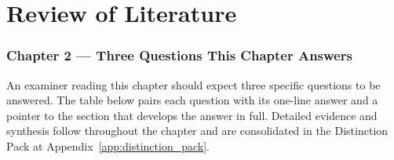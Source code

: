
\chapter{Review of Literature}

\subsection*{Chapter 2 --- Three Questions This Chapter Answers}
\label{sec:ch2_three_questions}

\noindent An examiner reading this chapter should expect three specific questions to be answered. The table below pairs each question with its one-line answer and a pointer to the section that develops the answer in full. Detailed evidence and synthesis follow throughout the chapter and are consolidated in the Distinction Pack at Appendix~\ref{app:distinction_pack}.

